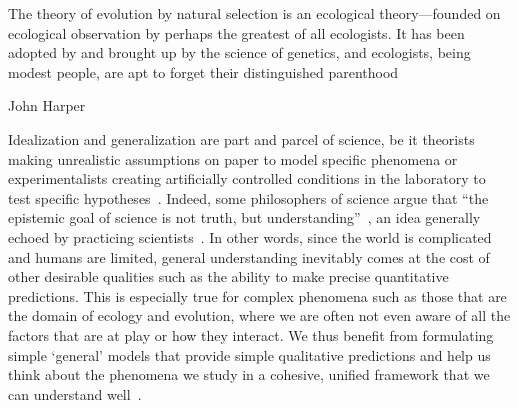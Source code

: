 \epigraph{\justifying The theory of evolution by natural selection is an ecological theory—founded on ecological observation by perhaps the greatest of all ecologists. It has been adopted by and brought up by the science of genetics, and ecologists, being modest people, are apt to forget their distinguished parenthood}{John Harper~\citep{harper_darwinian_1967}}

%
Idealization and generalization are part and parcel of science, be it theorists making unrealistic assumptions on paper to model specific phenomena or experimentalists creating artificially controlled conditions in the laboratory to test specific hypotheses~\citep{zuk_models_2018}. Indeed, some philosophers of science argue that ``the epistemic goal of science is not truth, but understanding''~\citep{potochnik_idealization_2018}, an idea generally echoed by practicing scientists~\citep{levins_strategy_1966,servedio_not_2014,zuk_models_2018,grainger_empiricists_2022}. In other words, since the world is complicated and humans are limited, general understanding inevitably comes at the cost of other desirable qualities such as the ability to make precise quantitative predictions. This is especially true for complex phenomena such as those that are the domain of ecology and evolution, where we are often not even aware of all the factors that are at play or how they interact. We thus benefit from formulating simple `general' models that provide simple qualitative predictions and help us think about the phenomena we study in a cohesive, unified framework that we can understand well~\citep{potochnik_idealization_2018,luque_mirror_2021}.   
 
